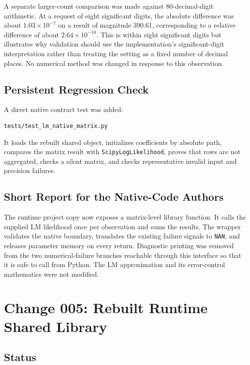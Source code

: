 \documentclass[11pt,a4paper]{article}
\begin{document}
A separate larger-count comparison was made against 80-decimal-digit arithmetic.
At a request of eight significant digits, the absolute difference was about
\(1.03\times10^{-7}\) on a result of magnitude 390.61, corresponding to a
relative difference of about \(2.64\times10^{-10}\). This is within eight
significant digits but illustrates why validation should use the implementation's
significant-digit interpretation rather than treating the setting as a fixed
number of decimal places. No numerical method was changed in response to this
observation.

\subsection{Persistent Regression Check}

A direct native contract test was added:

\begin{verbatim}
tests/test_lm_native_matrix.py
\end{verbatim}

It loads the rebuilt shared object, initializes coefficients by absolute path,
compares the matrix result with \texttt{ScipyLogLikelihood}, proves that rows
are not aggregated, checks a silent matrix, and checks representative invalid
input and precision failures.

\subsection{Short Report for the Native-Code Authors}

The runtime project copy now exposes a matrix-level library function. It calls
the supplied LM likelihood once per observation and sums the results. The
wrapper validates the native boundary, translates the existing failure signals
to \texttt{NAN}, and releases parameter memory on every return. Diagnostic
printing was removed from the two numerical-failure branches reachable through
this interface so that it is safe to call from Python. The LM approximation and
its error-control mathematics were not modified.

\section{Change 005: Rebuilt Runtime Shared Library}

\subsection{Status}
\end{document}
